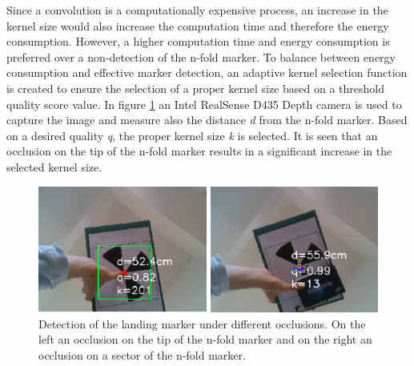 \documentclass[conference]{IEEEtran}
\begin{document}

Since a convolution is a computationally expensive process, an increase
in the kernel size would also increase the computation time and
therefore the energy consumption. However, a higher computation time and energy consumption
is preferred over a non-detection of the n-fold marker. To balance
between energy consumption and effective marker detection, an adaptive
kernel selection function is created to ensure the selection of a
proper kernel size based on a threshold quality score value. In figure
\ref{fig:NfoldOcclusions} an Intel RealSense D435 Depth camera is used
to capture the image and measure also the distance \emph{d} from the n-fold
marker. Based on a desired quality \emph{q}, the proper kernel size \emph{k} is
selected. It is seen that an occlusion on the tip of the n-fold marker
results in a significant increase in the selected kernel size.




%

\begin{figure}[t]
\centering
\includegraphics[scale=0.25]{nfold_occlusions.png}
\caption{Detection of the landing marker under different
  occlusions. On the left an occlusion on the tip of the n-fold marker
  and on the right an occlusion on a sector of the n-fold marker.}
\label{fig:NfoldOcclusions}
\end{figure}
\end{document}
